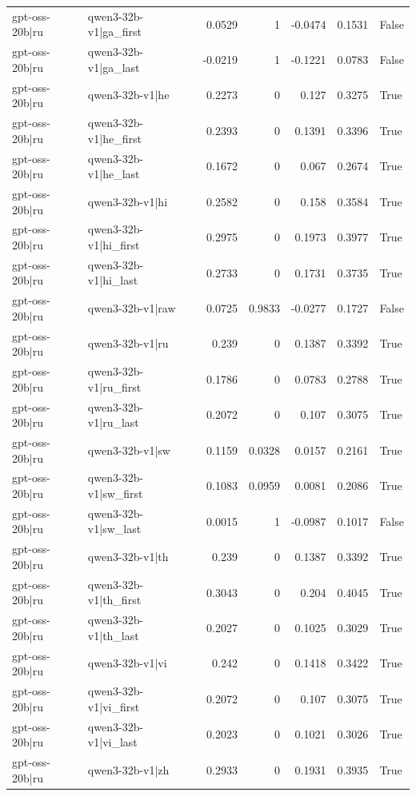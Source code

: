 \begin{table}
\begin{tabular}{l l r r r r l}
gpt-oss-20b|ru & qwen3-32b-v1|ga_first & 0.0529 & 1 & -0.0474 & 0.1531 & False \\
gpt-oss-20b|ru & qwen3-32b-v1|ga_last & -0.0219 & 1 & -0.1221 & 0.0783 & False \\
gpt-oss-20b|ru & qwen3-32b-v1|he & 0.2273 & 0 & 0.127 & 0.3275 & True \\
gpt-oss-20b|ru & qwen3-32b-v1|he_first & 0.2393 & 0 & 0.1391 & 0.3396 & True \\
gpt-oss-20b|ru & qwen3-32b-v1|he_last & 0.1672 & 0 & 0.067 & 0.2674 & True \\
gpt-oss-20b|ru & qwen3-32b-v1|hi & 0.2582 & 0 & 0.158 & 0.3584 & True \\
gpt-oss-20b|ru & qwen3-32b-v1|hi_first & 0.2975 & 0 & 0.1973 & 0.3977 & True \\
gpt-oss-20b|ru & qwen3-32b-v1|hi_last & 0.2733 & 0 & 0.1731 & 0.3735 & True \\
gpt-oss-20b|ru & qwen3-32b-v1|raw & 0.0725 & 0.9833 & -0.0277 & 0.1727 & False \\
gpt-oss-20b|ru & qwen3-32b-v1|ru & 0.239 & 0 & 0.1387 & 0.3392 & True \\
gpt-oss-20b|ru & qwen3-32b-v1|ru_first & 0.1786 & 0 & 0.0783 & 0.2788 & True \\
gpt-oss-20b|ru & qwen3-32b-v1|ru_last & 0.2072 & 0 & 0.107 & 0.3075 & True \\
gpt-oss-20b|ru & qwen3-32b-v1|sw & 0.1159 & 0.0328 & 0.0157 & 0.2161 & True \\
gpt-oss-20b|ru & qwen3-32b-v1|sw_first & 0.1083 & 0.0959 & 0.0081 & 0.2086 & True \\
gpt-oss-20b|ru & qwen3-32b-v1|sw_last & 0.0015 & 1 & -0.0987 & 0.1017 & False \\
gpt-oss-20b|ru & qwen3-32b-v1|th & 0.239 & 0 & 0.1387 & 0.3392 & True \\
gpt-oss-20b|ru & qwen3-32b-v1|th_first & 0.3043 & 0 & 0.204 & 0.4045 & True \\
gpt-oss-20b|ru & qwen3-32b-v1|th_last & 0.2027 & 0 & 0.1025 & 0.3029 & True \\
gpt-oss-20b|ru & qwen3-32b-v1|vi & 0.242 & 0 & 0.1418 & 0.3422 & True \\
gpt-oss-20b|ru & qwen3-32b-v1|vi_first & 0.2072 & 0 & 0.107 & 0.3075 & True \\
gpt-oss-20b|ru & qwen3-32b-v1|vi_last & 0.2023 & 0 & 0.1021 & 0.3026 & True \\
gpt-oss-20b|ru & qwen3-32b-v1|zh & 0.2933 & 0 & 0.1931 & 0.3935 & True \\

\end{tabular}
\end{table}
